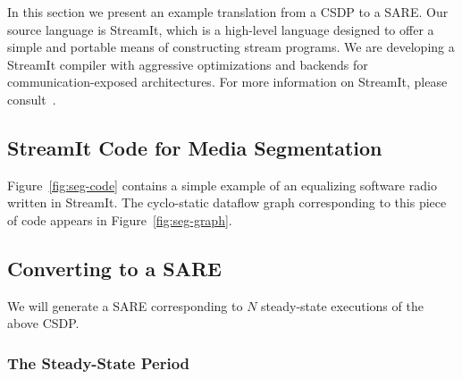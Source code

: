 
In this section we present an example translation from a CSDP to a
SARE.  Our source language is StreamIt, which is a high-level language
designed to offer a simple and portable means of constructing stream
programs.  We are developing a StreamIt compiler with aggressive
optimizations and backends for communication-exposed architectures.
For more information on StreamIt, please
consult~\cite{streamitcc,Gordo02}.

\subsection{StreamIt Code for Media Segmentation}

Figure~\ref{fig:seg-code} contains a simple example of an equalizing
software radio written in StreamIt.  The cyclo-static dataflow graph
corresponding to this piece of code appears in
Figure~\ref{fig:seg-graph}.


\subsection{Converting to a SARE}

We will generate a SARE corresponding to $N$ steady-state executions
of the above CSDP.

\subsubsection{The Steady-State Period}

